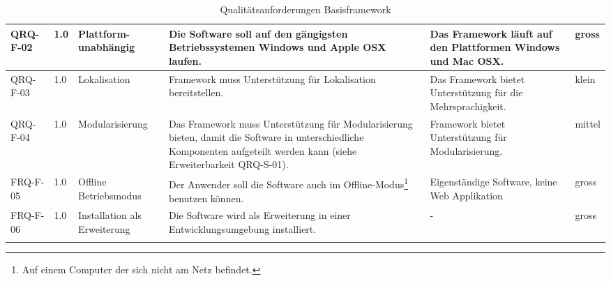 \begin{landscape}
\begin{longtable}{|p{1.8cm}|p{0.7cm}|p{2.5cm}|p{7cm}|p{4cm}|p{0.9cm}|}
   QRQ-F-02 & 1.0 & Plattform-unabhängig &  Die Software soll auf den gängigsten Betriebssystemen Windows und Apple OSX laufen. & Das Framework läuft auf den Plattformen Windows und Mac OSX. & gross \\\hline

   QRQ-F-03 & 1.0 & Lokalisation & Framework muss Unterstützung für Lokalisation bereitstellen. & Das Framework bietet Unterstützung für die Mehrsprachigkeit. &klein \\\hline

   QRQ-F-04 & 1.0 & Modularisierung & Das Framework muss Unterstützung für Modularisierung bieten, damit die Software in unterschiedliche Komponenten aufgeteilt werden kann (siehe Erweiterbarkeit QRQ-S-01). & Framework bietet Unterstützung für Modularisierung.&mittel \\\hline

   FRQ-F-05 & 1.0 & Offline Betriebsmodus & Der Anwender soll die Software auch im Offline-Modus\footnote{Auf einem Computer der sich nicht am Netz befindet.} benutzen können. & Eigenständige Software, keine Web Applikation & gross  \\\hline

   FRQ-F-06 & 1.0 & Installation als Erweiterung& Die Software wird als Erweiterung in einer Entwicklungsumgebung installiert. & - & gross  \\\hline

    \caption{Qualitätsanforderungen Basisframework}
\end{longtable}
\end{landscape}


